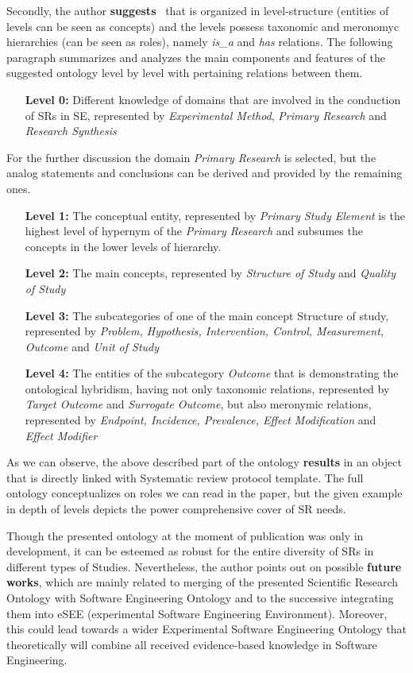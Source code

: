 	Secondly, the author \textbf{suggests} \frqq \ that is organized in level-structure (entities of levels can be seen as concepts) and the levels possess taxonomic and meronomyc hierarchies (can be seen as roles), namely \textit{is\_a} and \textit{has} relations. The following paragraph summarizes and analyzes the main components and features of the suggested ontology level by level with pertaining relations between them.
		\begin{itemize}
			\item[\textbf{Level 0:}]  Different knowledge of domains that are involved in the conduction of SRs in SE, represented by \textit{Experimental Method}, \textit{Primary Research} and \textit{Research Synthesis} 
		\end{itemize}
	For the further discussion the domain \textit{Primary Research} is selected, but the analog statements and conclusions can be derived and provided by the remaining ones.
		\begin{itemize}
			\item[\textbf{Level 1:}] The conceptual entity, represented by \textit{Primary Study Element} is the highest level of hypernym of the \textit{Primary Research} and subsumes the concepts in the lower levels of hierarchy.
			\item[\textbf{Level 2:}] The main concepts, represented by \textit{Structure of Study} and \textit{Quality of Study} 
			\item[\textbf{Level 3:}] The subcategories of one of the main concept Structure of study, represented by \textit{Problem, Hypothesis, Intervention, Control, Measurement, Outcome} and \textit{Unit of Study}
			\item[\textbf{Level 4:}] The entities of the subcategory \textit{Outcome} that is demonstrating the ontological hybridism, having not only taxonomic relations, represented by \textit{Target Outcome} and \textit{Surrogate Outcome}, but also meronymic relations, represented by \textit{Endpoint, Incidence, Prevalence, Effect Modification} and \textit{Effect Modifier} 
		\end{itemize}
	  As we can observe, the above described part of the ontology \textbf{results} in an object that is directly linked with Systematic review protocol template. The full ontology conceptualizes on roles we can read in the paper, but the given example in depth of levels depicts the power comprehensive cover of SR needs.
	  
	  Though the presented ontology at the moment of publication was only in development, it can be esteemed as robust for the entire diversity of SRs in different types of Studies. Nevertheless, the  author points out on possible \textbf{future works}, which are mainly related to merging of the presented Scientific Research Ontology with Software Engineering Ontology and to the successive integrating them into eSEE (experimental Software Engineering Environment). Moreover, this could lead towards a wider Experimental Software Engineering Ontology that theoretically will combine all received evidence-based knowledge in Software Engineering.  
	 
